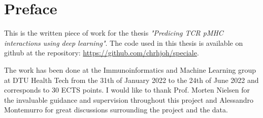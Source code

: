 \section*{Preface}
This is the written piece of work for the thesis \textit{"Predicing TCR pMHC interactions using deep learning"}. The code used in this thesis is available on github at the repository: \url{https://github.com/chrhjoh/speciale}. 

The work has been done at the Immunoinformatics and Machine Learning group at DTU Health Tech from the 31th of January 2022 to the 24th of June 2022 and corresponds to 30 ECTS points.
I would like to thank Prof. Morten Nielsen for the invaluable guidance and supervision throughout this project and Alessandro Montemurro for great discussions surrounding the project and the data.
